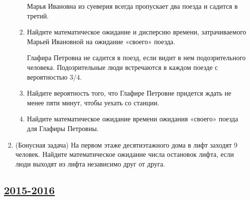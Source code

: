 \begin{enumerate}
\begin{enumerate}
Марья Ивановна из суеверия всегда пропускает два поезда и садится в третий.

\item	Найдите математическое ожидание и дисперсию времени,
затрачиваемого Марьей Ивановной на ожидание «своего» поезда.

Глафира Петровна не садится в поезд, если видит в нем подозрительного человека.
Подозрительные люди встречаются в каждом поезде с вероятностью $3/4$.

\item	Найдите вероятность того, что Глафире Петровне придется ждать не менее пяти минут,
чтобы уехать со станции.
\item	Найдите математическое ожидание времени ожидания «своего» поезда для Глафиры Петровны.
\end{enumerate}

\item (Бонусная задача)
На первом этаже десятиэтажного дома в лифт заходят 9 человек.
Найдите математическое ожидание числа остановок лифта, 
если люди выходят из лифта независимо друг от друга.
\end{enumerate}


\newpage
\subsection[2015-2016]{\hyperref[sec:sol_kr_01_2015_2016]{2015-2016}}
\label{sec:kr_01_2015_2016}

